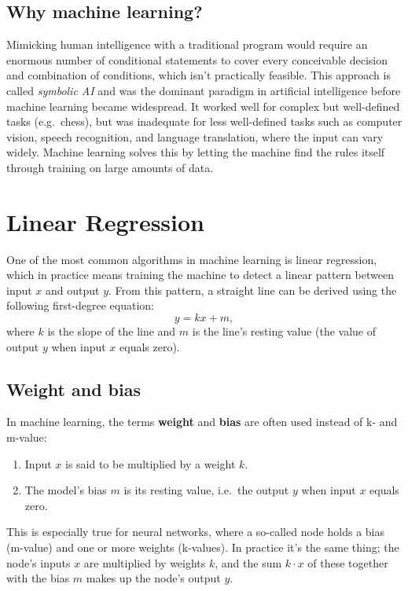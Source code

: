 \subsection{Why machine learning?}
Mimicking human intelligence with a traditional program would require an enormous number of
conditional statements to cover every conceivable decision and combination of conditions, which
isn't practically feasible. This approach is called \emph{symbolic AI} and was the dominant
paradigm in artificial intelligence before machine learning became widespread. It worked well for
complex but well-defined tasks (e.g.\ chess), but was inadequate for less well-defined tasks such as
computer vision, speech recognition, and language translation, where the input can vary widely.
Machine learning solves this by letting the machine find the rules itself through training on large
amounts of data.

\section{Linear Regression}
\label{c1:sec:linreg}
One of the most common algorithms in machine learning is linear regression, which in practice means
training the machine to detect a linear pattern between input $x$ and output $y$. From this pattern,
a straight line can be derived using the following first-degree equation:
\[
  y = kx + m,
\]
where $k$ is the slope of the line and $m$ is the line's resting value (the value of output $y$
when input $x$ equals zero).

\subsection{Weight and bias}
In machine learning, the terms \textbf{weight} and \textbf{bias} are often used instead of k- and
m-value:
\begin{enumerate}
  \item Input $x$ is said to be multiplied by a weight $k$.
  \item The model's bias $m$ is its resting value, i.e.\ the output $y$ when input $x$ equals zero.
\end{enumerate}
This is especially true for neural networks, where a so-called node holds a bias (m-value) and one
or more weights (k-values). In practice it's the same thing; the node's inputs $x$ are multiplied
by weights $k$, and the sum $k \cdot x$ of these together with the bias $m$ makes up the node's
output $y$.

